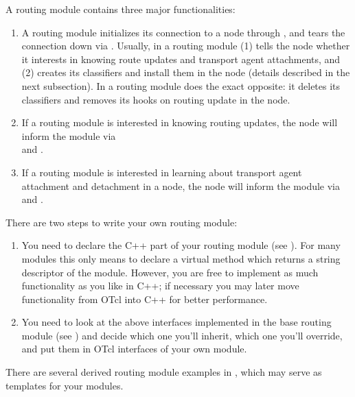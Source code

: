 A routing module contains three major functionalities:
\begin{enumerate}
\item %
  A routing module initializes its connection to a node through
  , and tears the connection down via
  .
  Usually, in  a routing module (1) tells the node
  whether it
  interests in knowing route updates and transport agent attachments,
  and (2) creates its classifiers and install them in the node
  (details described in the next subsection).
  In  a routing module does the exact opposite: it
  deletes its classifiers and removes its hooks on routing update in
  the node.
\item %
  If a routing module is interested in knowing routing updates, the
  node will inform the module via \\
   and
  .
\item %
  If a routing module is interested in learning about transport agent
  attachment and detachment in a node, the node will inform the module
  via \\ 
   and
  .
\end{enumerate}

There are two steps to write your own routing module:
\begin{enumerate}
\item You need to declare the C++ part of your routing
  module (see ). For many modules this only
  means to declare a virtual method  which returns a
  string descriptor of the module. However, you are free to implement
  as much functionality as you like in C++; if necessary you may
  later move functionality from OTcl into C++ for better performance. 
\item You need to look at the above interfaces implemented in the base
  routing module (see ) and decide which
  one you'll inherit, which one you'll override, and put them in OTcl
  interfaces of your own module. 
\end{enumerate}
There are several derived routing module examples in
, which may serve as templates for your
modules.

